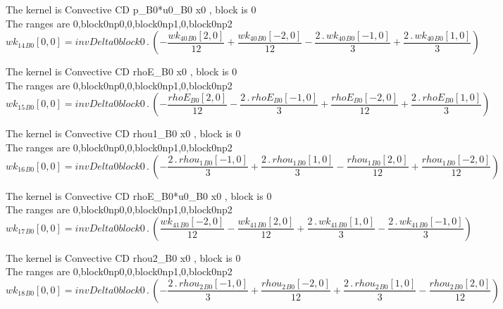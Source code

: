 \documentclass{article}
\begin{document}
\noindent The kernel is Convective CD p_B0*u0_B0 x0 , block is 0\\\noindent The ranges are 0,block0np0,0,block0np1,0,block0np2\\\begin{dmath}{wk_{14}{_{B0}}}[{0,0}] = invDelta0block0 \,.\, \left(- \frac{{wk_{40}{_{B0}}}[{2,0}]}{12} + \frac{{wk_{40}{_{B0}}}[{-2,0}]}{12} - \frac{2 \,.\, {wk_{40}{_{B0}}}[{-1,0}]}{3} + \frac{2 \,.\, {wk_{40}{_{B0}}}[{1,0}]}{3}\right)\end{dmath}

\noindent The kernel is Convective CD rhoE_B0 x0 , block is 0\\\noindent The ranges are 0,block0np0,0,block0np1,0,block0np2\\\begin{dmath}{wk_{15}{_{B0}}}[{0,0}] = invDelta0block0 \,.\, \left(- \frac{{rhoE{_{B0}}}[{2,0}]}{12} - \frac{2 \,.\, {rhoE{_{B0}}}[{-1,0}]}{3} + \frac{{rhoE{_{B0}}}[{-2,0}]}{12} + \frac{2 \,.\, {rhoE{_{B0}}}[{1,0}]}{3}\right)\end{dmath}

\noindent The kernel is Convective CD rhou1_B0 x0 , block is 0\\\noindent The ranges are 0,block0np0,0,block0np1,0,block0np2\\\begin{dmath}{wk_{16}{_{B0}}}[{0,0}] = invDelta0block0 \,.\, \left(- \frac{2 \,.\, {rhou_{1}{_{B0}}}[{-1,0}]}{3} + \frac{2 \,.\, {rhou_{1}{_{B0}}}[{1,0}]}{3} - \frac{{rhou_{1}{_{B0}}}[{2,0}]}{12} + 
\frac{{rhou_{1}{_{B0}}}[{-2,0}]}{12}\right)\end{dmath}

\noindent The kernel is Convective CD rhoE_B0*u0_B0 x0 , block is 0\\\noindent The ranges are 0,block0np0,0,block0np1,0,block0np2\\\begin{dmath}{wk_{17}{_{B0}}}[{0,0}] = invDelta0block0 \,.\, \left(\frac{{wk_{41}{_{B0}}}[{-2,0}]}{12} - \frac{{wk_{41}{_{B0}}}[{2,0}]}{12} + \frac{2 \,.\, {wk_{41}{_{B0}}}[{1,0}]}{3} - \frac{2 \,.\, {wk_{41}{_{B0}}}[{-1,0}]}{3}\right)\end{dmath}

\noindent The kernel is Convective CD rhou2_B0 x0 , block is 0\\\noindent The ranges are 0,block0np0,0,block0np1,0,block0np2\\\begin{dmath}{wk_{18}{_{B0}}}[{0,0}] = invDelta0block0 \,.\, \left(- \frac{2 \,.\, {rhou_{2}{_{B0}}}[{-1,0}]}{3} + \frac{{rhou_{2}{_{B0}}}[{-2,0}]}{12} + \frac{2 \,.\, {rhou_{2}{_{B0}}}[{1,0}]}{3} - 
\frac{{rhou_{2}{_{B0}}}[{2,0}]}{12}\right)\end{dmath}
\end{document}
